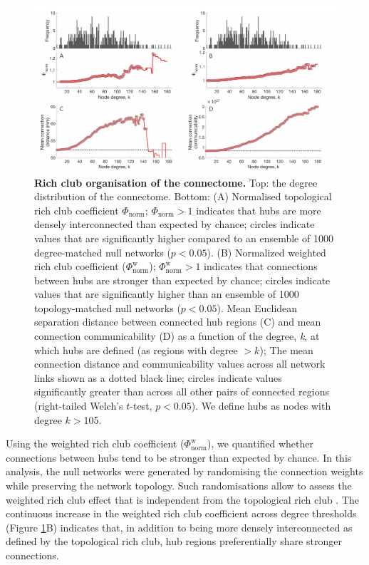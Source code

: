 \begin{figure}[h!]
\begin{center}
\includegraphics[width=1\textwidth]{Chapter5/Ch5Fig3.pdf}%
\end{center}
\caption{\textbf{Rich club organisation of the connectome.}
Top: the degree distribution of the connectome. Bottom:
(A) Normalised topological rich club coefficient $\Phi_\mathrm{norm}$; $\Phi_\mathrm{norm} >1$ indicates that hubs are more densely interconnected than expected by chance; circles indicate values that are significantly higher compared to an ensemble of 1000 degree-matched null networks ($p < 0.05$).
(B) Normalized weighted rich club coefficient ($\Phi_\mathrm{norm}^\mathrm{w}$); $\Phi_\mathrm{norm}^\mathrm{w}>1$ indicates that connections between hubs are stronger than expected by chance; circles indicate values that are significantly higher than an ensemble of 1000 topology-matched null networks ($p < 0.05$). Mean Euclidean separation distance between connected hub regions (C) and mean connection communicability (D) as a function of the degree, \textit{k}, at which hubs are defined (as regions with degree $> k$); The mean connection distance and communicability values across all network links shown as a dotted black line; circles indicate values significantly greater than across all other pairs of connected regions (right-tailed Welch’s $t$-test, $p < 0.05$). We define hubs as nodes with degree $k > $105.}
\label{fig:Ch5Fig3}
\end{figure}

Using the weighted rich club coefficient ($\Phi_\mathrm{norm}^\mathrm{w}$), we quantified whether connections between hubs tend to be stronger than expected by chance. In this analysis, the null networks were generated by randomising the connection weights while preserving the network topology. Such randomisations allow to assess the weighted rich club effect that is independent from the topological rich club \citep{Alstott2014}. The continuous increase in the weighted rich club coefficient across degree thresholds (Figure \ref{fig:Ch5Fig3}B) indicates that, in addition to being more densely interconnected as defined by the topological rich club, hub regions preferentially share stronger connections.

